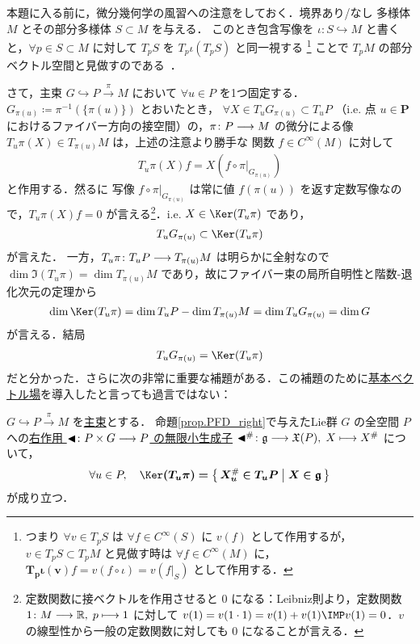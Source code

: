\documentclass[geometry_main]{subfiles}
\begin{document}
本題に入る前に，微分幾何学の風習への注意をしておく．境界あり/なし \cinfty 多様体 $M$ とその部分多様体 $S \subset M$ を与える．
このとき包含写像を $\iota \colon S \hookrightarrow M$ と書くと，$\forall p \in S \subset M$ に対して $T_p S$ を $T_p \iota (T_p S)$ と同一視する
\footnote{
    つまり $\forall v \in T_p S$ は $\forall f \in C^\infty (S)$ に $v(f)$ として作用するが，$v \in T_p S \subset T_p M$ と見做す時は $\forall f \in C^\infty (M)$ に，$\bm{T_p \iota(v)}f = v(f \circ \iota) = v(f|_S)$ として作用する．
}
ことで $T_p M$ の部分ベクトル空間と見做すのである~\cite[p.116]{Lee12}．

さて，主束 $G \hookrightarrow P \xrightarrow{\pi} M$ において $\forall u \in P$ を1つ固定する．
$G_{\pi(u)} \coloneqq \pi^{-1}(\{\pi(u)\})$ とおいたとき，
$\forall X \in T_u G_{\pi(u)} \subset T_u P$ （i.e. 点 $u \in \bm{P}$ におけるファイバー方向の接空間）の，$\pi \colon P \longrightarrow M$ の微分による像 $T_u \pi (X) \in T_{\pi(u)} M$ は，上述の注意より勝手な \cinfty 関数 $f \in C^\infty (M)$ に対して
\begin{align}
    T_u \pi (X)f = X(f \circ \pi|_{G_{\pi(u)}})
\end{align}
と作用する．然るに \cinfty 写像 $f \circ \pi|_{G_{\pi(u)}}$ は常に値 $f(\pi(u))$ を返す定数写像なので，$T_u \pi (X)f = 0$ が言える\footnote{定数関数に接ベクトルを作用させると $0$ になる：Leibniz則より，定数関数 $1 \colon M \longrightarrow \mathbb{R},\;p \longmapsto 1$ に対して $v(1) = v(1\cdot 1) = v(1) + v(1) \IMP v(1) = 0$．$v$ の線型性から一般の定数関数に対しても $0$ になることが言える．}．i.e. $X \in \Ker (T_u \pi)$ であり，
\begin{align}
    T_u G_{\pi(u)} \subset \Ker (T_u \pi)
\end{align}
が言えた．
一方，$T_u \pi \colon T_u P \longrightarrow T_{\pi(u)} M$ は明らかに全射なので $\dim \Im (T_u \pi) = \dim T_{\pi(u)} M$ であり，故にファイバー束の局所自明性と階数-退化次元の定理から
\begin{align}
    \label{eq:dim}
    \dim \Ker (T_u \pi) = \dim T_u P - \dim T_{\pi(u)} M = \dim T_u G_{\pi(u)} = \dim G
\end{align}
が言える．結局
\begin{align}
    \label{eq:tangent-fiber}
    T_u G_{\pi(u)} = \Ker (T_u \pi)
\end{align}
だと分かった．さらに次の非常に重要な補題がある．この補題のために\hyperref[def:fundamental-vecf]{基本ベクトル場}を導入したと言っても過言ではない：
\begin{mylem}[label=lem:connection]{}
    $G \hookrightarrow P \xrightarrow{\pi} M$ を\hyperref[def.PFD]{主束}とする．
    命題\ref{prop.PFD_right}で与えたLie群 $G$ の全空間 $P$ への\hyperref[def:fundamental-vecf]{右作用 $\blacktriangleleft \colon P \times G \longrightarrow P$ の無限小生成子} $\blacktriangleleft^\# \colon \mathfrak{g} \longrightarrow \mathfrak{X}(P),\; X \longmapsto X^\#$ について，
    \begin{align}
        \forall u \in P,\quad \bm{\Ker (T_{u} \pi) = \bigl\{\, X^\#_{u} \in T_{u} P \bigm| X \in \mathfrak{g} \,\bigr\}}
    \end{align}
    が成り立つ．
\end{mylem}
\end{document}
